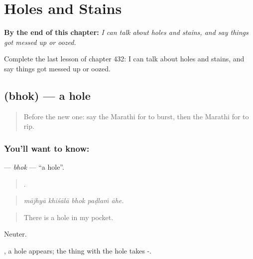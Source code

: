
\chapter{Holes and Stains}
\label{ch:mr-holes-and-stains}

\begin{chapteropening}
\textbf{By the end of this chapter:} \emph{I can talk about holes and stains, and say things got messed up or oozed.}

Complete the last lesson of chapter 432: I can talk about holes and stains, and say things got messed up or oozed.
\end{chapteropening}

\section[\texorpdfstring{\mr{भोक} (bhok)}{भोक (bhok)}]{ (bhok) — a hole}

\label{lesson:MR-C432-bhok}



\begin{quote}
Before the new one: say the Marathi for to burst, then the Marathi for to rip.
\end{quote}

\subsection*{You'll want to know: }
\textbf{} — \emph{bhok} — \textquotedblleft{}a hole\textquotedblright{}.

\begin{quote}
    .
\end{quote}

\begin{quote}
\emph{mājhyā khiśālā bhok paḍlaṁ āhe.}
\end{quote}

\begin{quote}
There is a hole in my pocket.
\end{quote}

Neuter.

 , a hole appears; the thing with the hole takes -.

